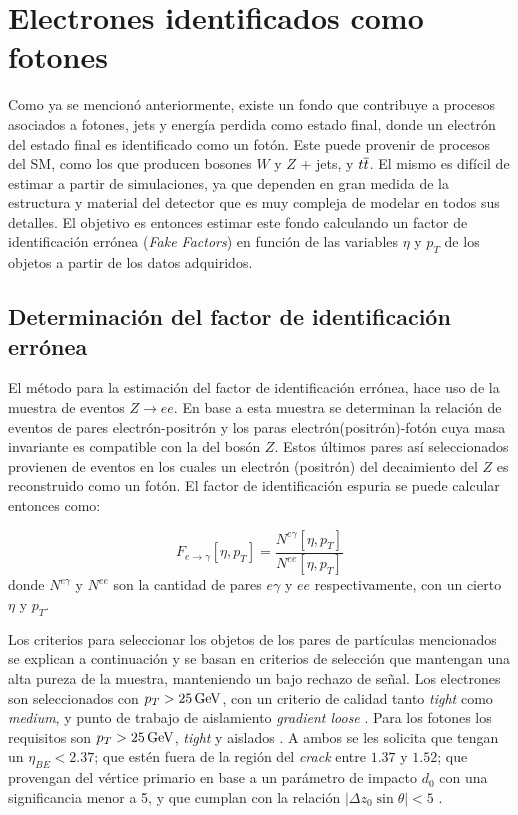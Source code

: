 \chapter{Electrones identificados como fotones}\label{ch:e_fake}


Como ya se mencionó anteriormente, existe un fondo que contribuye a procesos asociados a fotones, jets y energía perdida como estado final, donde un electrón del estado final es identificado como un fotón. Este puede provenir de procesos del SM, como los que producen bosones $W$ y $Z$ + jets, y $t \overline{t}$. El mismo es difícil de estimar a partir de simulaciones, ya que dependen en gran medida de la estructura y material del detector que es muy compleja de modelar en todos sus detalles. El objetivo es entonces estimar este fondo calculando un factor de identificación errónea (\textit{Fake Factors}) en función de las variables $\eta$ y $p_{T}$ de los objetos a partir de los datos adquiridos.

\section{Determinación del factor de identificación errónea}

El método para la estimación del factor de identificación errónea, hace uso de la muestra de eventos $Z\rightarrow ee$. En base a esta muestra se determinan la relación de eventos de pares electrón-positrón y los paras electrón(positrón)-fotón cuya masa invariante es compatible con la del bosón $Z$. Estos últimos pares así seleccionados provienen de eventos en los cuales un electrón (positrón) del decaimiento del $Z$ es reconstruido como un fotón. El factor de identificación espuria se puede calcular entonces como: 

\begin{equation}
F_{e\rightarrow\gamma}[\eta , p_{T}]=\frac{N^{e\gamma}[\eta , p_{T}]}{N^{ee}[\eta , p_{T}]} \label{eq:ff_ratio}
\end{equation}
%
donde $N^{e\gamma}$ y $N^{ee}$ son la cantidad de pares $e\gamma$ y $ee$ respectivamente, con un cierto $\eta$ y $p_{T}$.

Los criterios para seleccionar los objetos de los pares de partículas mencionados se explican a continuación y se basan en criterios de selección que mantengan una alta pureza de la muestra, manteniendo un bajo rechazo de señal.
Los electrones  son seleccionados con $p_{T} > 25 \, \mathrm{GeV}$, con un criterio de calidad tanto \textit{tight} como \textit{medium}, y punto de trabajo de aislamiento \textit{gradient loose} \cite{ATLAS-CONF-2016-024}. Para los fotones los requisitos son $p_{T} > 25 \, \mathrm{GeV}$, \textit{tight} y aislados \cite{STDM-2010-08}. A ambos se les solicita que tengan un $\eta_{BE}<2.37$; que estén fuera de la región del \textit{crack} entre $1.37$ y $1.52$; que provengan del vértice primario en base a un parámetro de impacto $d_{0}$ con una significancia menor a 5, y que cumplan con la relación $|\Delta z_{0}\sin\theta|<5$ .

